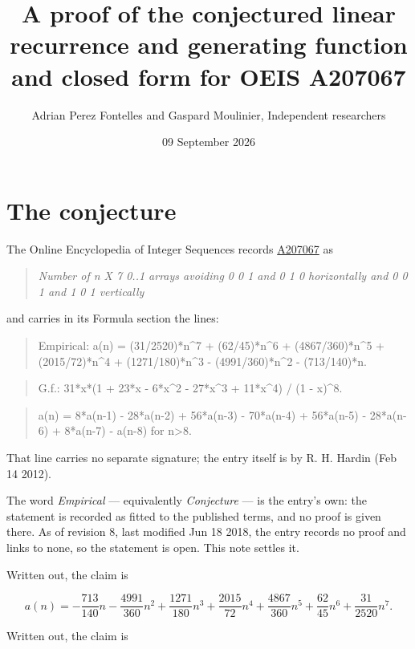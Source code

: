 \documentclass[11pt]{article}
\title{A proof of the conjectured linear recurrence and generating function and closed form for OEIS A207067}
\author{Adrian Perez Fontelles and Gaspard Moulinier, Independent researchers}
\date{09 September 2026}
\theoremstyle{definition}
\begin{document}
\maketitle
\section{The conjecture}

The Online Encyclopedia of Integer Sequences records \href{https://oeis.org/A207067}{A207067} as

\begin{quote}\itshape Number of n X 7 0..1 arrays avoiding 0 0 1 and 0 1 0 horizontally and 0 0 1 and 1 0 1 vertically\end{quote}

and carries in its Formula section the lines:

\begin{quote}\ttfamily Empirical: a(n) = (31/2520)*n\textasciicircum{}7 + (62/45)*n\textasciicircum{}6 + (4867/360)*n\textasciicircum{}5 + (2015/72)*n\textasciicircum{}4 + (1271/180)*n\textasciicircum{}3 - (4991/360)*n\textasciicircum{}2 - (713/140)*n.\end{quote}

\begin{quote}\ttfamily G.f.: 31*x*(1 + 23*x - 6*x\textasciicircum{}2 - 27*x\textasciicircum{}3 + 11*x\textasciicircum{}4) / (1 - x)\textasciicircum{}8.\end{quote}

\begin{quote}\ttfamily a(n) = 8*a(n-1) - 28*a(n-2) + 56*a(n-3) - 70*a(n-4) + 56*a(n-5) - 28*a(n-6) + 8*a(n-7) - a(n-8) for n>8.\end{quote}

That line carries no separate signature; the entry itself is by R. H. Hardin (Feb 14 2012).

The word {\itshape Empirical} --- equivalently {\itshape Conjecture} --- is the entry's own: the statement is recorded as fitted to the published terms, and no proof is given there. As of revision 8, last modified Jun 18 2018, the entry records no proof and links to none, so the statement is open. This note settles it.

Written out, the claim is

\[a(n) = -\frac{713}{140}n - \frac{4991}{360}n^{2} + \frac{1271}{180}n^{3} + \frac{2015}{72}n^{4} + \frac{4867}{360}n^{5} + \frac{62}{45}n^{6} + \frac{31}{2520}n^{7}.\]

Written out, the claim is
\end{document}
